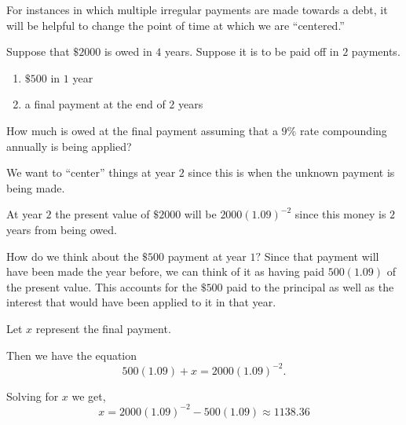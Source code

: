 For instances in which multiple irregular payments are made towards a debt, it will be helpful to change the point of time at which we are ``centered.''


\begin{example}
    Suppose that \(\$2000\) is owed in \(4\) years. Suppose it is to be paid off in \(2\) payments.
    \begin{enumerate}
        \item \(\$500\) in \(1\) year
        \item a final payment at the end of \(2\) years
    \end{enumerate}
    How much is owed at the final payment assuming that a \(9\%\) rate compounding annually is being applied?
    \begin{solution}
        We want to ``center'' things at year \(2\) since this is when the unknown payment is being made.

        At year \(2\) the present value of \(\$2000\) will be \(2000\left(1.09\right)^{-2}\) since this money is \(2\) years from being owed.

        How do we think about the \(\$500\) payment at year \(1?\) Since that payment will have been made the year before, we can think of it as having paid \(500\left(1.09\right)\) of the present value. This accounts for the \(\$500\) paid to the principal as well as the interest that would have been applied to it in that year.

        Let \(x\) represent the final payment.

        Then we have the equation
         \[500\left(1.09\right)+x = 2000\left(1.09\right)^{-2}.\]

         Solving for \(x\) we get,
         \[x = 2000\left(1.09\right)^{-2} - 500\left(1.09\right) \approx 1138.36\]
    \end{solution}
\end{example}
